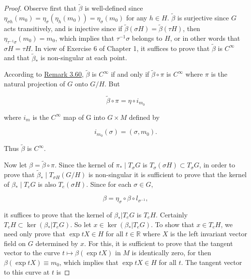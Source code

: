 \begin{proof}
Observe first that $\tilde{\beta}$ is well-defined since $\eta_{\sigma h}(m_0) = \eta_\sigma(\eta_h(m_0)) = \eta_\sigma(m_0)$ for any $h \in H$. $\tilde{\beta}$ is surjective since $G$ acts transitively, and is injective since if $\tilde{\beta}(\sigma H) = \tilde{\beta}(\tau H)$, then $\eta_{\tau^{-1}\sigma}(m_0) = m_0$, which implies that $\tau^{-1}\sigma$ belongs to $H$, or in other words that $\sigma H = \tau H$. In view of Exercise 6 of Chapter 1, it suffices to prove that $\tilde{\beta}$ is $C^\infty$ and that $\tilde{\beta}_{*}$ is non-singular at each point.

According to \hyperref[thm:3.60]{Remark 3.60}, $\tilde{\beta}$ is $C^{\infty}$ if and only if $\tilde{\beta}\circ\pi$ is $C^{\infty}$ where $\pi$ is the natural projection of $G$ onto $G/H$. But

\begin{equation}
\tag{2}\label{eq:3.62:2}
\tilde{\beta}\circ\pi=\eta\circ i_{m_{0}}
\end{equation}

where  $ i_{m} $ is the  $ C^{\infty} $ map of G into  $ G \times M $ defined by

\begin{equation}
\tag{3}\label{eq:3.62:3}
i_{m_{0}}(\sigma)=(\sigma,m_{0}).
\end{equation}

Thus  $ \tilde{\beta} $ is  $ C^{\infty} $.

Now let $\beta=\tilde{\beta}\circ\pi$. Since the kernel of $\pi_{*}\mid T_{\sigma} G$ is $T_{\sigma}(\sigma H)\subset T_{\sigma} G$, in order to prove that $\tilde{\beta}_{*}\mid T_{\sigma H}(G/H)$ is non-singular it is sufficient to prove that the kernel of $\beta_{*}\mid T_{e} G$ is also $T_e(\sigma H)$. Since for each $\sigma\in G$,

\begin{equation}
\tag{4}\label{eq:3.62:4}
\beta=\eta_{\sigma}\circ\beta\circ l_{\sigma^{-1}},
\end{equation}

it suffices to prove that the kernel of $\beta_{*} \big| T_{e} G$ is $T_{e} H$. Certainly $T_{e} H \subset \ker(\beta_{*} \big| T_{e} G)$. So let $x \in \ker(\beta_{*} \big| T_{e} G)$. To show that $x \in T_{e} H$, we need only prove that $\exp tX \in H$ for all $t \in \mathbb{R}$ where $X$ is the left invariant vector field on $G$ determined by $x$. For this, it is sufficient to prove that the tangent vector to the curve $t \mapsto \beta(\exp tX)$ in $M$ is identically zero, for then $\beta(\exp tX) \equiv m_{0}$, which implies that $\exp tX \in H$ for all $t$. The tangent vector to this curve at $t$ is


\end{proof}
